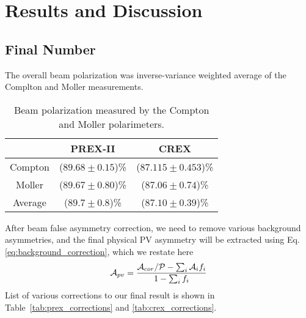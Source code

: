 \chapter{Results and Discussion}

\section{Final Number}

\begin{comment}
    Measured asymmetry 
    $\downarrow$
    correct for Coulomb distortions 
    $\downarrow$
    Weak density at one $Q^2$
    $\downarrow$
    small correction for $G_E^n$, $G_E^s$
    $\downarrow$
    Neutron density at one $Q^2$
    $\downarrow$
    assume suface thickness good to 25\% (MFT)
    $\downarrow$
    $R_n$

\end{comment}
The overall beam polarization was inverse-variance weighted average of the Complton
and Moller measurements.
\begin{table}[!h]
    \centering
    \begin{tabular}{c | c c}
	\hline
	    & PREX-II	& CREX	\\
	\hline
	Compton	& ($89.68 \pm 0.15$)\%  & ($87.115 \pm 0.453$)\%	\\
	Moller	& ($89.67 \pm 0.80$)\%	& ($87.06 \pm 0.74$)\%  \\
	\hline
	Average	& ($89.7 \pm 0.8$)\%	& ($87.10 \pm 0.39$)\%	\\
	\hline
    \end{tabular}
    \caption{Beam polarization measured by the Compton and Moller polarimeters.}
\end{table}

After beam false asymmetry correction, we need to remove various background 
asymmetries, and the final physical PV asymmetry will be extracted using 
Eq. \ref{eq:background_correction}, which we restate here 
\begin{equation*}
    \mathcal{A}_{pv} = \frac{\mathcal{A}_{cor}/\mathcal{P} - \sum_i \mathcal{A}_i f_i}{1 - \sum_i f_i}
\end{equation*}
List of various corrections to our final result is shown in 
Table~\ref{tab:prex_corrections} and \ref{tab:crex_corrections}.

